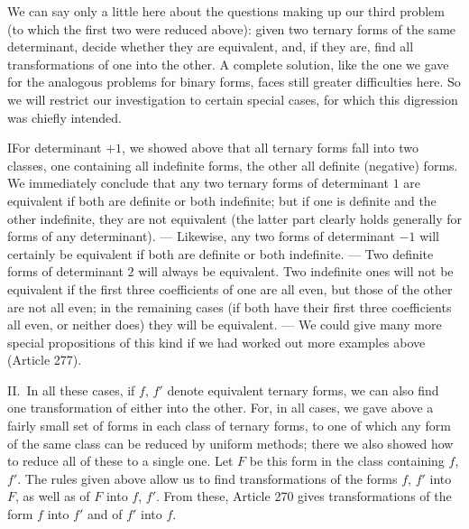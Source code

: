 We can say only a little here about the questions making up our third
problem (to which the first two were reduced above): given two ternary
forms of the same determinant, decide whether they are equivalent, and,
if they are, find all transformations of one into the other. A complete
solution, like the one we gave for the analogous problems for binary
forms, faces still greater difficulties here.
So we will restrict our investigation to certain special cases, for
which this digression was chiefly intended.

I\quad For determinant $+1$, we showed above that all ternary forms
fall into two classes, one containing all indefinite forms, the other
all definite (negative) forms. We immediately conclude that any two
ternary forms of determinant $1$ are equivalent if both are definite
or both indefinite; but if one is definite and the other indefinite,
they are not equivalent (the latter part clearly holds generally for
forms of any determinant). --- Likewise, any two forms of determinant
$-1$ will certainly be equivalent if both are definite or both indefinite.
--- Two definite forms of determinant $2$ will always be equivalent.
Two indefinite ones will not be equivalent if the first three coefficients
of one are all even, but those of the other are not all even; in the
remaining cases (if both have their first three coefficients all even,
or neither does) they will be equivalent. --- We could give many more
special propositions of this kind if we had worked out more examples
above (Article 277).

II.\ In all these cases, if $f$, $f'$ denote equivalent ternary
forms, we can also find one transformation of either into the other.
For, in all cases, we gave above a fairly small set of forms in each
class of ternary forms, to one of which any form of the same class can
be reduced by uniform methods; there we also showed how to reduce all
of these to a single one. Let $F$ be this form in the class containing
$f$, $f'$. The rules given above allow us to find transformations
of the forms $f$, $f'$ into $F$, as well as of $F$ into
$f$, $f'$. From these, Article 270 gives transformations of the
form $f$ into $f'$ and of $f'$ into $f$.


